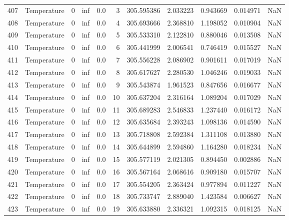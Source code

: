 \begin{tabular}{llrrrrrrrrr}
407 &  Temperature &       0 &  inf &  0.0 &    3 &  305.595386 &  2.033223 &  0.943669 &   0.014971 &      NaN \\
408 &  Temperature &       0 &  inf &  0.0 &    4 &  305.693666 &  2.368810 &  1.198052 &   0.010904 &      NaN \\
409 &  Temperature &       0 &  inf &  0.0 &    5 &  305.533310 &  2.122810 &  0.880046 &   0.013508 &      NaN \\
410 &  Temperature &       0 &  inf &  0.0 &    6 &  305.441999 &  2.006541 &  0.746419 &   0.015527 &      NaN \\
411 &  Temperature &       0 &  inf &  0.0 &    7 &  305.556228 &  2.086902 &  0.901611 &   0.017019 &      NaN \\
412 &  Temperature &       0 &  inf &  0.0 &    8 &  305.617627 &  2.280530 &  1.046246 &   0.019033 &      NaN \\
413 &  Temperature &       0 &  inf &  0.0 &    9 &  305.543874 &  1.961523 &  0.847656 &   0.016677 &      NaN \\
414 &  Temperature &       0 &  inf &  0.0 &   10 &  305.637204 &  2.316164 &  1.089204 &   0.017029 &      NaN \\
415 &  Temperature &       0 &  inf &  0.0 &   11 &  305.689283 &  2.546833 &  1.237440 &   0.016172 &      NaN \\
416 &  Temperature &       0 &  inf &  0.0 &   12 &  305.635684 &  2.393243 &  1.098136 &   0.014590 &      NaN \\
417 &  Temperature &       0 &  inf &  0.0 &   13 &  305.718808 &  2.592384 &  1.311108 &   0.013880 &      NaN \\
418 &  Temperature &       0 &  inf &  0.0 &   14 &  305.644899 &  2.594860 &  1.164280 &   0.018234 &      NaN \\
419 &  Temperature &       0 &  inf &  0.0 &   15 &  305.577119 &  2.021305 &  0.894450 &   0.002886 &      NaN \\
420 &  Temperature &       0 &  inf &  0.0 &   16 &  305.567164 &  2.068616 &  0.909180 &   0.015707 &      NaN \\
421 &  Temperature &       0 &  inf &  0.0 &   17 &  305.554205 &  2.363424 &  0.977894 &   0.011227 &      NaN \\
422 &  Temperature &       0 &  inf &  0.0 &   18 &  305.733747 &  2.889040 &  1.423584 &   0.006627 &      NaN \\
423 &  Temperature &       0 &  inf &  0.0 &   19 &  305.633880 &  2.336321 &  1.092315 &   0.018125 &      NaN \\

\end{tabular}
